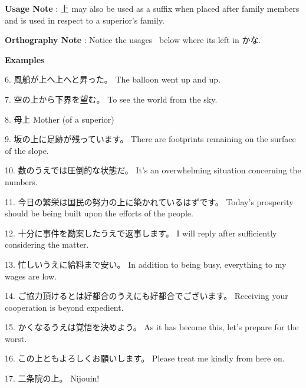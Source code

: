 \par{\textbf{Usage Note }: 上 may also be used as a suffix when placed after family members and is used in respect to a superior's family. }
 
\par{\textbf{Orthography Note }: Notice the usages  below where its left in かな. }
 
\begin{center}
\textbf{Examples } 
\end{center}

\par{6. 風船が上へ上へと昇った。 \hfill\break
The balloon went up and up. }
 
\par{7. 空の上から下界を望む。 \hfill\break
To see the world from the sky. }
 
\par{8. 母上 \hfill\break
Mother (of a superior) }
 
\par{9. 坂の上に足跡が残っています。 \hfill\break
There are footprints remaining on the surface of the slope. }
 
\par{10. 数のうえでは圧倒的な状態だ。 \hfill\break
It's an overwhelming situation concerning the numbers. }
 
\par{11. 今日の繁栄は国民の努力の上に築かれているはずです。 \hfill\break
Today's prosperity should be being built upon the efforts of the people. }
 
\par{12. 十分に事件を勘案したうえで返事します。 \hfill\break
I will reply after sufficiently considering the matter. }
 
\par{13. 忙しいうえに給料まで安い。 \hfill\break
In addition to being busy, everything to my wages are low. }
 
\par{14. ご協力頂けるとは好都合のうえにも好都合でございます。 \hfill\break
Receiving your cooperation is beyond expedient. }
 
\par{15. かくなるうえは覚悟を決めよう。 \hfill\break
As it has become this, let's prepare for the worst. }
 
\par{16. この上ともよろしくお願いします。 \hfill\break
Please treat me kindly from here on. }
 
\par{17. 二条院の上。 \hfill\break
Nijouin! }
 
